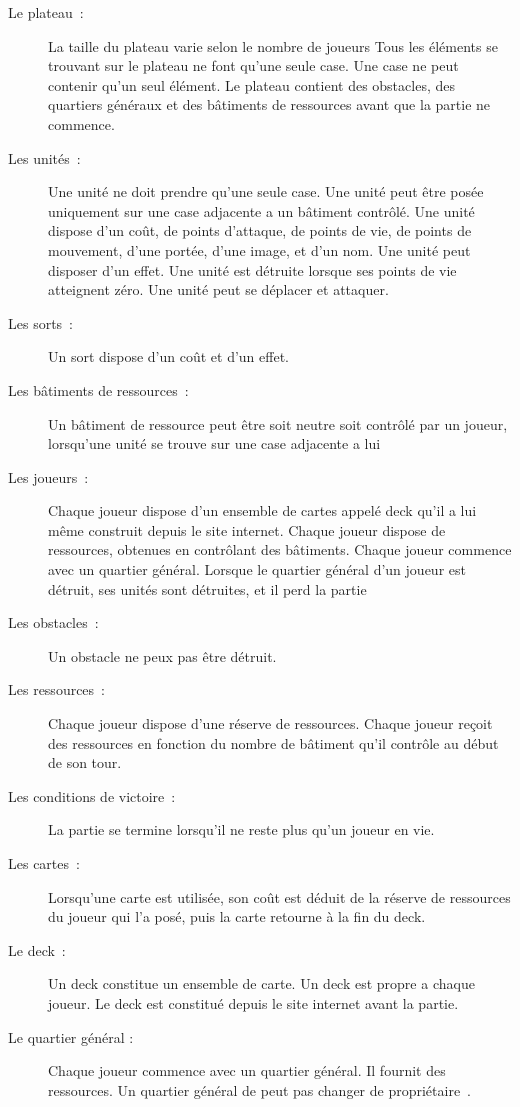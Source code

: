\documentclass[a4paper, titlepage]{livret}
\begin{document}
      \begin{description}
        \item[Le plateau :] 	La taille du plateau varie selon le nombre de joueurs
	Tous les éléments se trouvant sur le plateau ne font qu’une seule case.
	Une case ne peut contenir qu’un seul élément.
	Le plateau contient des obstacles, des quartiers généraux et des bâtiments de ressources 			avant que la partie ne commence. 
        \item[Les unités : ]	Une unité ne doit prendre qu’une seule case.
	Une unité peut être posée uniquement sur une case adjacente a un bâtiment contrôlé.
	Une unité dispose d’un coût, de points d’attaque, de points de vie, de points de mouvement, 		d’une portée, d’une image, et d’un nom.
	Une unité peut disposer d’un effet.
	Une unité est détruite lorsque ses points de vie atteignent zéro.
	Une unité peut se déplacer et attaquer.
        \item[Les sorts :] Un sort dispose d’un coût et d’un effet.

        \item[Les bâtiments de ressources :]Un bâtiment de ressource peut être soit neutre soit contrôlé par un joueur, lorsqu’une unité 		se trouve sur une case adjacente a lui
        \item[Les joueurs :] 	Chaque joueur dispose d’un ensemble de cartes appelé deck qu’il a lui même construit 		depuis le site internet.
	Chaque joueur dispose de ressources, obtenues en contrôlant des bâtiments.
	Chaque joueur commence avec un quartier général.
	Lorsque le quartier général d’un joueur est détruit, ses unités sont détruites, et il perd la 			partie
        \item[Les obstacles :] Un obstacle ne peux pas être détruit.
        \item[Les ressources :] Chaque joueur dispose d’une réserve de ressources. 	Chaque joueur reçoit des ressources en fonction du nombre de bâtiment qu’il contrôle au début de son tour. 
        \item[Les conditions de victoire : ] La partie se termine lorsqu’il ne reste plus qu’un joueur en vie.
        \item[Les cartes : ] Lorsqu’une carte est utilisée, son coût est déduit de la réserve de ressources du joueur qui l’a 		posé, puis la carte retourne à la fin du deck.
        \item[Le deck : ]	Un deck constitue un ensemble de carte.
	Un deck est propre a chaque joueur.
	Le deck est constitué depuis le site internet avant la partie.
	      \item[Le quartier général : ]Chaque joueur commence avec un quartier général. Il fournit des ressources.
	Un quartier général de peut pas changer de propriétaire .
        
      \end{description}
    
\end{document}
